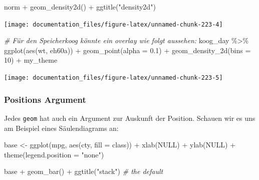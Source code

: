 \documentclass[
]{article}
\newenvironment{Shaded}{\begin{snugshade}}{\end{snugshade}}
\newcommand{\AttributeTok}[1]{\textcolor[rgb]{0.77,0.63,0.00}{#1}}
\newcommand{\CommentTok}[1]{\textcolor[rgb]{0.56,0.35,0.01}{\textit{#1}}}
\newcommand{\ConstantTok}[1]{\textcolor[rgb]{0.00,0.00,0.00}{#1}}
\newcommand{\DecValTok}[1]{\textcolor[rgb]{0.00,0.00,0.81}{#1}}
\newcommand{\FloatTok}[1]{\textcolor[rgb]{0.00,0.00,0.81}{#1}}
\newcommand{\FunctionTok}[1]{\textcolor[rgb]{0.00,0.00,0.00}{#1}}
\newcommand{\NormalTok}[1]{#1}
\newcommand{\OtherTok}[1]{\textcolor[rgb]{0.56,0.35,0.01}{#1}}
\newcommand{\SpecialCharTok}[1]{\textcolor[rgb]{0.00,0.00,0.00}{#1}}
\newcommand{\StringTok}[1]{\textcolor[rgb]{0.31,0.60,0.02}{#1}}
\begin{document}
\begin{Shaded}
\begin{Highlighting}[]
\NormalTok{norm }\SpecialCharTok{+} \FunctionTok{geom\_density2d}\NormalTok{() }\SpecialCharTok{+} \FunctionTok{ggtitle}\NormalTok{(}\StringTok{"density2d"}\NormalTok{)}
\end{Highlighting}
\end{Shaded}

\begin{center}\texttt{[image: documentation\_files/figure-latex/unnamed-chunk-223-4]} \end{center}

\begin{Shaded}
\begin{Highlighting}[]

\CommentTok{\# Für den Speicherkoog könnte ein overlay wie folgt aussehen:}
\NormalTok{koog\_day }\SpecialCharTok{\%\textgreater{}\%}
  \FunctionTok{ggplot}\NormalTok{(}\FunctionTok{aes}\NormalTok{(wt, eh60a)) }\SpecialCharTok{+}
  \FunctionTok{geom\_point}\NormalTok{(}\AttributeTok{alpha =} \FloatTok{0.1}\NormalTok{) }\SpecialCharTok{+}
  \FunctionTok{geom\_density\_2d}\NormalTok{(}\AttributeTok{bins =} \DecValTok{10}\NormalTok{) }\SpecialCharTok{+}
\NormalTok{  my\_theme}
\end{Highlighting}
\end{Shaded}

\begin{center}\texttt{[image: documentation\_files/figure-latex/unnamed-chunk-223-5]} \end{center}

\hypertarget{positions-argument}{%
\subsubsection{Positions Argument}\label{positions-argument}}

Jedes \texttt{geom} hat auch ein Argument zur Auskunft der Position. Schauen wir es uns am Beispiel eines Säulendiagrams an:

\begin{Shaded}
\begin{Highlighting}[]
\NormalTok{base }\OtherTok{\textless{}{-}} \FunctionTok{ggplot}\NormalTok{(mpg, }\FunctionTok{aes}\NormalTok{(cty, }\AttributeTok{fill =}\NormalTok{ class)) }\SpecialCharTok{+} 
  \FunctionTok{xlab}\NormalTok{(}\ConstantTok{NULL}\NormalTok{) }\SpecialCharTok{+} \FunctionTok{ylab}\NormalTok{(}\ConstantTok{NULL}\NormalTok{) }\SpecialCharTok{+} \FunctionTok{theme}\NormalTok{(}\AttributeTok{legend.position =} \StringTok{"none"}\NormalTok{)}

\NormalTok{base }\SpecialCharTok{+} \FunctionTok{geom\_bar}\NormalTok{() }\SpecialCharTok{+} \FunctionTok{ggtitle}\NormalTok{(}\StringTok{"stack"}\NormalTok{) }\CommentTok{\# the default}
\end{Highlighting}
\end{Shaded}
\end{document}
